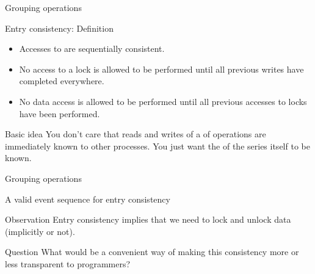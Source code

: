 \begin{slide}{Grouping operations}
  \begin{block}{Entry consistency: Definition}
    \begin{itemize}
    \item Accesses to  are sequentially consistent.
    \item No access to a lock is allowed to be performed until all previous writes have completed everywhere.
    \item No data access is allowed to be performed until all previous accesses to locks have been performed.
    \end{itemize}
  \end{block}
  \onslide
  \begin{block}{Basic idea} 
    You don't care that reads and writes of a  of operations are immediately known to other
    processes. You just want the  of the series itself to be known.
  \end{block}
\end{slide}
\begin{slide}{Grouping operations}
  \begin{block}{A valid event sequence for entry consistency}
    \begin{center}
    \end{center}
  \end{block}
  \begin{block}{Observation} 
    Entry consistency implies that we need to lock and unlock data (implicitly or not).
  \end{block}
  \begin{block}{Question}
    What would be a convenient way of making this consistency more or less transparent to programmers?
  \end{block}
\end{slide}

